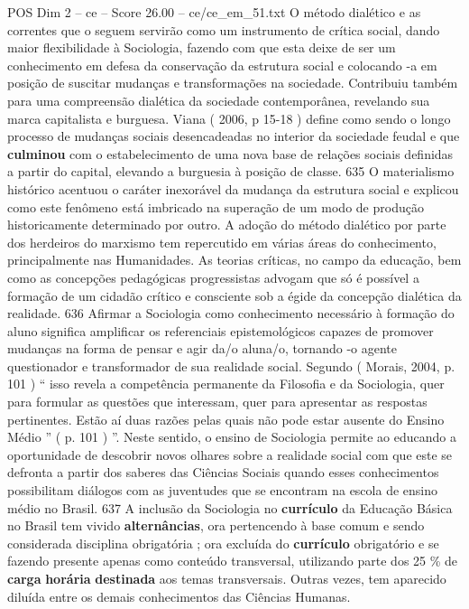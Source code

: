 \begin{textsample}{POS Dim 2 – ce – Score 26.00 – ce/ce\_em\_51.txt}
O método dialético e as correntes que o seguem servirão como um instrumento de crítica social, dando maior flexibilidade à Sociologia, fazendo com que esta deixe de ser um conhecimento em defesa da conservação da estrutura social e colocando -a em posição de suscitar mudanças e transformações na sociedade.
Contribuiu também para uma compreensão dialética da sociedade contemporânea, revelando sua marca capitalista e burguesa.
Viana ( 2006, p 15-18 ) define como sendo o longo processo de mudanças sociais desencadeadas no interior da sociedade feudal e que \textbf{culminou} com o estabelecimento de uma nova base de relações sociais definidas a partir do capital, elevando a burguesia à posição de classe. 635 O materialismo histórico acentuou o caráter inexorável da mudança da estrutura social e explicou como este fenômeno está imbricado na superação de um modo de produção historicamente determinado por outro.
A adoção do método dialético por parte dos herdeiros do marxismo tem repercutido em várias áreas do conhecimento, principalmente nas Humanidades.
As teorias críticas, no campo da educação, bem como as concepções pedagógicas progressistas advogam que só é possível a formação de um cidadão crítico e consciente sob a égide da concepção dialética da realidade. 636 Afirmar a Sociologia como conhecimento necessário à formação do aluno significa amplificar os referenciais epistemológicos capazes de promover mudanças na forma de pensar e agir da/o aluna/o, tornando -o agente questionador e transformador de sua realidade social.
Segundo ( Morais, 2004, p. 101 ) “ isso revela a competência permanente da Filosofia e da Sociologia, quer para formular as questões que interessam, quer para apresentar as respostas pertinentes.
Estão aí duas razões pelas quais não pode estar ausente do Ensino Médio ” ( p. 101 ) ”.
Neste sentido, o ensino de Sociologia permite ao educando a oportunidade de descobrir novos olhares sobre a realidade social com que este se defronta a partir dos saberes das Ciências Sociais quando esses conhecimentos possibilitam diálogos com as juventudes que se encontram na escola de ensino médio no Brasil. 637 A inclusão da Sociologia no \textbf{currículo} da Educação Básica no Brasil tem vivido \textbf{alternâncias}, ora pertencendo à base comum e sendo considerada disciplina obrigatória ; ora excluída do \textbf{currículo} obrigatório e se fazendo presente apenas como conteúdo transversal, utilizando parte dos 25 \% de \textbf{carga} \textbf{horária} \textbf{destinada} aos temas transversais.
Outras vezes, tem aparecido diluída entre os demais conhecimentos das Ciências Humanas.

\end{textsample}

